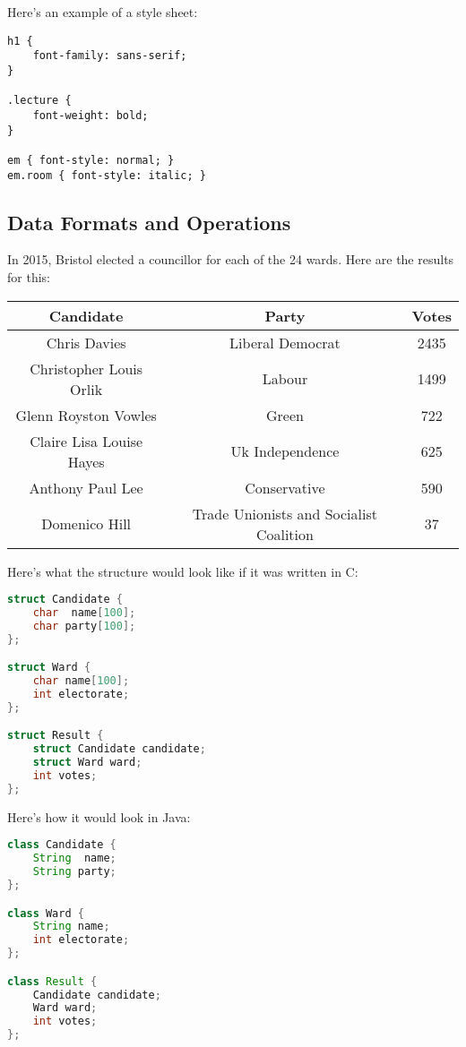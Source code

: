 \documentclass[11pt,a4paper,titlepage,dvipsnames,cmyk]{scrartcl}
\begin{document}
Here's an example of a style sheet:
\begin{lstlisting}[]
h1 {
    font-family: sans-serif;
}

.lecture {
    font-weight: bold;
}

em { font-style: normal; }
em.room { font-style: italic; }
\end{lstlisting}

\subsection{Data Formats and Operations}%
\label{sub:Data Formats and Operations}
In 2015, Bristol elected a councillor for each of the 24 wards. Here are
the results for this:
\begin{center}
    \begin{tabular}{|c|c|c|}
        \hline
        \textbf{Candidate} & \textbf{Party} & \textbf{Votes} \\
        \hline
        Chris Davies & Liberal Democrat & 2435 \\
        \hline
        Christopher Louis Orlik & Labour & 1499 \\
        \hline
        Glenn Royston Vowles & Green & 722 \\
        \hline
        Claire Lisa Louise Hayes & Uk Independence & 625 \\
        \hline
        Anthony Paul Lee & Conservative & 590 \\
        \hline
        Domenico Hill & Trade Unionists and Socialist Coalition & 37 \\
        \hline
    \end{tabular}
\end{center}

Here's what the structure would look like if it was written in C:
\begin{lstlisting}[language=c]
struct Candidate {
    char  name[100];
    char party[100];
};

struct Ward {
    char name[100];
    int electorate;
};

struct Result {
    struct Candidate candidate;
    struct Ward ward;
    int votes;
};
\end{lstlisting}

Here's how it would look in Java:
\begin{lstlisting}[language=java]
class Candidate {
    String  name;
    String party;
};

class Ward {
    String name;
    int electorate;
};

class Result {
    Candidate candidate;
    Ward ward;
    int votes;
};
\end{lstlisting}
\end{document}
